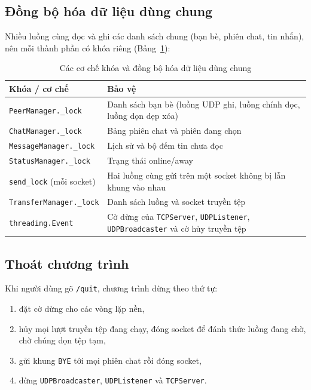 \documentclass[a4paper,12pt]{article}
\newcommand{\code}[1]{\texttt{#1}}
\begin{document}
	\subsection{Đồng bộ hóa dữ liệu dùng chung}
	Nhiều luồng cùng đọc và ghi các danh sách chung (bạn bè, phiên chat, tin nhắn), nên mỗi thành phần có khóa riêng (Bảng~\ref{tab:sync_locks}):
	
	\begin{table}[H]
		\centering
		\small
		\renewcommand{\arraystretch}{1.35}
		\begin{tabularx}{\textwidth}{|>{\raggedright\arraybackslash}p{4.8cm}|X|}
			\hline
			\rowcolor{blue!12}
			\textcolor{blue!80!black}{\textbf{Khóa / cơ chế}} & \textcolor{blue!80!black}{\textbf{Bảo vệ}} \\
			\hline
			\code{PeerManager.\_lock} & Danh sách bạn bè (luồng UDP ghi, luồng chính đọc, luồng dọn dẹp xóa) \\
			\hline
			\code{ChatManager.\_lock} & Bảng phiên chat và phiên đang chọn \\
			\hline
			\code{MessageManager.\_lock} & Lịch sử và bộ đếm tin chưa đọc \\
			\hline
			\code{StatusManager.\_lock} & Trạng thái online/away \\
			\hline
			\code{send\_lock} (mỗi socket) & Hai luồng cùng gửi trên một socket không bị lẫn khung vào nhau \\
			\hline
			\code{TransferManager.\_lock} & Danh sách luồng và socket truyền tệp \\
			\hline
			\code{threading.Event} & Cờ dừng của \code{TCPServer}, \code{UDPListener}, \code{UDPBroadcaster} và cờ hủy truyền tệp \\
			\hline
		\end{tabularx}
		\caption{Các cơ chế khóa và đồng bộ hóa dữ liệu dùng chung}
		\label{tab:sync_locks}
	\end{table}
	
	\subsection{Thoát chương trình}
	Khi người dùng gõ \code{/quit}, chương trình dừng theo thứ tự:
	\begin{enumerate}
		\item đặt cờ dừng cho các vòng lặp nền,
		\item hủy mọi lượt truyền tệp đang chạy, đóng socket để đánh thức luồng đang chờ, chờ chúng dọn tệp tạm,
		\item gửi khung \code{BYE} tới mọi phiên chat rồi đóng socket,
		\item dừng \code{UDPBroadcaster}, \code{UDPListener} và \code{TCPServer}.
	\end{enumerate}
	
\end{document}
